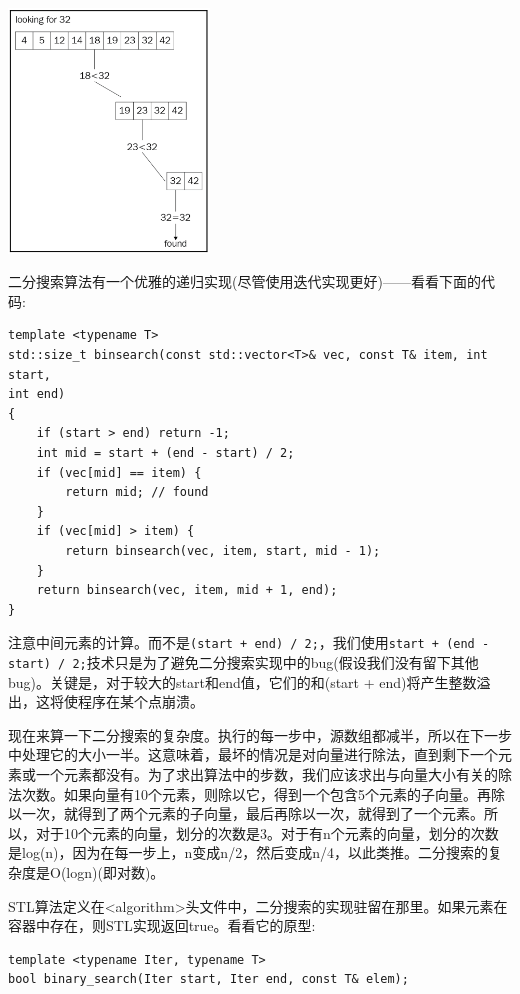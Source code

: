 \begin{center}
	\includegraphics[width=0.4\textwidth]{content/Section-2/Chapter-6/21}
\end{center}

二分搜索算法有一个优雅的递归实现(尽管使用迭代实现更好)——看看下面的代码: \par

\begin{lstlisting}[caption={}]
template <typename T>
std::size_t binsearch(const std::vector<T>& vec, const T& item, int start,
int end)
{
	if (start > end) return -1;
	int mid = start + (end - start) / 2;
	if (vec[mid] == item) {
		return mid; // found
	}
	if (vec[mid] > item) {
		return binsearch(vec, item, start, mid - 1);
	}
	return binsearch(vec, item, mid + 1, end);
}
\end{lstlisting}

注意中间元素的计算。而不是\texttt{(start + end) / 2;}，我们使用\texttt{start + (end - start) / 2;}技术只是为了避免二分搜索实现中的bug(假设我们没有留下其他bug)。关键是，对于较大的start和end值，它们的和(start + end)将产生整数溢出，这将使程序在某个点崩溃。 \par
现在来算一下二分搜索的复杂度。执行的每一步中，源数组都减半，所以在下一步中处理它的大小一半。这意味着，最坏的情况是对向量进行除法，直到剩下一个元素或一个元素都没有。为了求出算法中的步数，我们应该求出与向量大小有关的除法次数。如果向量有10个元素，则除以它，得到一个包含5个元素的子向量。再除以一次，就得到了两个元素的子向量，最后再除以一次，就得到了一个元素。所以，对于10个元素的向量，划分的次数是3。对于有n个元素的向量，划分的次数是log(n)，因为在每一步上，n变成n/2，然后变成n/4，以此类推。二分搜索的复杂度是O(logn)(即对数)。 \par
STL算法定义在<algorithm>头文件中，二分搜索的实现驻留在那里。如果元素在容器中存在，则STL实现返回true。看看它的原型: \par

\begin{lstlisting}[caption={}]
template <typename Iter, typename T>
bool binary_search(Iter start, Iter end, const T& elem);
\end{lstlisting}

